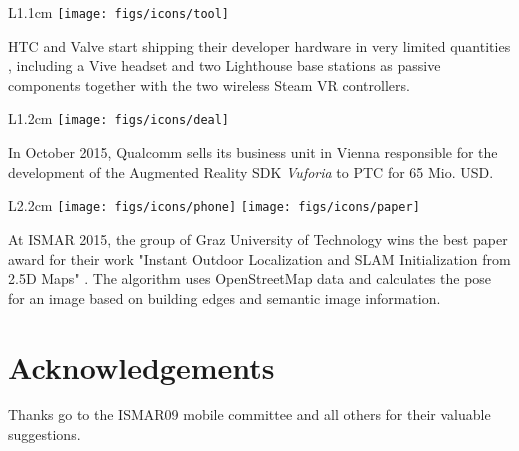 \documentclass[12pt,a4paper]{article}
\begin{document}
\vspace{0.1in}

\begin{wrapfigure}{L}{1.1cm}
	\vspace{-10pt}	
	\texttt{[image: figs/icons/tool]}
	\vspace{-15pt}		
\end{wrapfigure}
\noindent HTC and Valve start shipping their developer hardware in very limited quantities , including a Vive headset and two Lighthouse base stations as passive components together with the two wireless  Steam VR controllers.

\vspace{0.3in}

\begin{wrapfigure}{L}{1.2cm}
	\vspace{5pt}	
	\texttt{[image: figs/icons/deal]}
	\vspace{-20pt}		
\end{wrapfigure} 
\noindent In October 2015, Qualcomm sells its business unit in Vienna responsible for the development of the Augmented Reality SDK \emph{Vuforia} to PTC  for 65 Mio. USD. 

\vspace{0.20in}

\begin{wrapfigure}{L}{2.2cm}	
	\vspace{-15pt}	
	\texttt{[image: figs/icons/phone]}
	\texttt{[image: figs/icons/paper]}
	\vspace{-10pt}		
\end{wrapfigure} 
\noindent At ISMAR 2015, the group of Graz University of Technology wins the best paper award for their work "Instant Outdoor Localization and {SLAM} Initialization from 2.5D Maps" \cite{ArthPVSL15}. The algorithm uses OpenStreetMap data and calculates the pose for an image based on building edges and semantic image information. 

\section*{Acknowledgements}

Thanks go to the ISMAR09 mobile committee and all others for their valuable suggestions.



\parskip=0pt
\parsep=0pt




\parskip=0pt
\parsep=0pt

\end{document}
